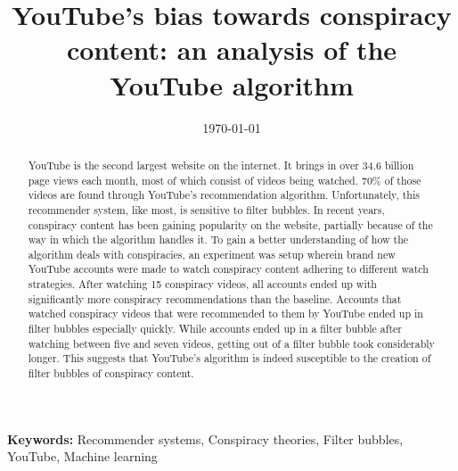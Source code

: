 \documentclass{uva-inf-article}
\title{YouTube's bias towards conspiracy content: an analysis of the YouTube algorithm}
\date{\today}
\begin{document}
\maketitle

\begin{abstract}
    YouTube is the second largest website on the internet. It brings in over 34.6 billion page views each month,
    most of which consist of videos being watched. 70\% of those videos are found through YouTube's 
    recommendation algorithm. Unfortunately, this recommender system, like most, is sensitive to filter bubbles. In recent years, conspiracy content has been gaining popularity on the website, partially because of the way in which the algorithm handles it. To gain a better understanding of how the algorithm deals with conspiracies, an experiment was setup wherein brand new YouTube accounts were made to watch conspiracy content adhering to different watch strategies. After watching 15 conspiracy videos, all accounts ended up with significantly more conspiracy recommendations than the baseline. Accounts that watched conspiracy videos that were recommended to them by YouTube ended up in filter bubbles especially quickly. While accounts ended up in a filter bubble after watching between five and seven videos, getting out of a filter bubble took considerably longer. This suggests that YouTube's algorithm is indeed susceptible to the creation of filter bubbles of conspiracy content. 
\end{abstract}

{\bf Keywords:} Recommender systems, Conspiracy theories, Filter bubbles, YouTube, Machine learning

\linenumbers















\newpage



\newpage
\nolinenumbers

 

\newpage


\end{document}
